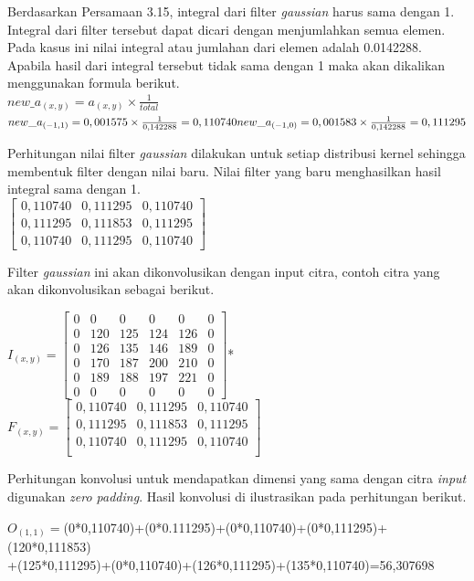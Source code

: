 \noindent Berdasarkan Persamaan 3.15, integral dari filter \emph{gaussian} harus sama dengan 1. Integral dari filter tersebut dapat dicari dengan menjumlahkan semua elemen. Pada kasus ini nilai integral atau jumlahan dari elemen adalah 0.0142288. Apabila hasil dari integral tersebut tidak sama dengan 1 maka akan dikalikan menggunakan formula berikut.\\
$
new\_a_{(x,y)}=a_{(x,y)}\times\frac{1}{total}
$\\
$
new\_a_{(-1,1)}=0,001575\times\frac{1}{0,142288}=0,110740\\
new\_a_{(-1,0)}=0,001583\times\frac{1}{0,142288}=0,111295
$

\noindent Perhitungan nilai filter \emph{gaussian} dilakukan untuk setiap distribusi kernel sehingga membentuk filter dengan nilai baru. Nilai filter yang baru menghasilkan hasil integral sama dengan 1.\\

\noindent
$\left[
\begin{matrix}
0,110740&0,111295&0,110740\\
0,111295&0,111853&0,111295\\
0,110740&0,111295&0,110740
\end{matrix}
\right]$

\noindent Filter \emph{gaussian} ini akan dikonvolusikan dengan input citra, contoh citra yang akan dikonvolusikan sebagai berikut.

\noindent
$I_{(x,y)}=\left[
\begin{matrix}
0&0&0&0&0&0\\
0&120&	125&	124&	126&0\\
0&126&	135&	146&	189&0\\
0&170&	187&	200&	210&0\\
0&189&	188&	197&	221&0\\
0&0&0&0&0&0
\end{matrix}
\right]$*
$F_{(x,y)}=\left[
\begin{matrix}
0,110740 &0,111295&0,110740\\
0,111295&0,111853&0,111295\\
0,110740&0,111295&0,110740\\
\end{matrix}
\right]$

\noindent Perhitungan konvolusi untuk mendapatkan dimensi yang sama dengan citra \emph{input} digunakan \emph{zero padding}. Hasil konvolusi di ilustrasikan pada perhitungan berikut.

\noindent $O_{(1,1)}=$(0*0,110740)+(0*0.111295)+(0*0,110740)+(0*0,111295)+(120*0,111853)\\
+(125*0,111295)+(0*0,110740)+(126*0,111295)+(135*0,110740)=56,307698


